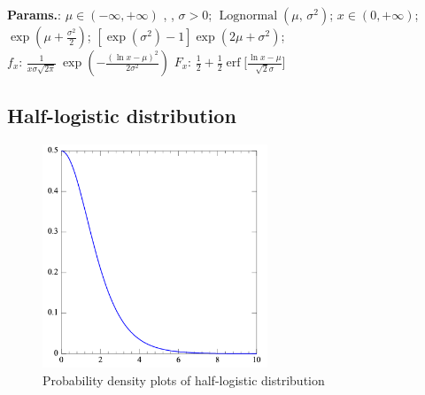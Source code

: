     {\color{darkblue} \textbf{Params.}:} {$\mu \in (-\infty, +\infty) $ , ,  $\sigma > 0$}; {$\operatorname{Lognormal}(\mu,\,\sigma^2)$}; {$x \in (0, +\infty)$}; {$\exp\left(\mu+\frac{\sigma^2}{2}\right)$}; {$[\exp(\sigma^2)-1] \exp(2\mu+\sigma^2)$};\hspace{0.5cm}\\{\color{darkblue} \textbf{$f_x$}:} {$\frac 1 {x\sigma\sqrt{2\pi}}\ \exp\left(-\frac{\left(\ln x-\mu\right)^2}{2\sigma^2}\right)$}{\color{darkblue} \textbf{$F_x$}:} {$\frac12 + \frac12\operatorname{erf}\Big[\frac{\ln x-\mu}{\sqrt{2}\sigma}\Big]$}



    
        
\subsection{Half-logistic distribution}


    \begin{figure}[H]
        \centering
        \includegraphics[width=0.6\textwidth]{images/Half-logistic distribution pdf.png}
        \caption{Probability density plots of half-logistic distribution}
    \end{figure}




